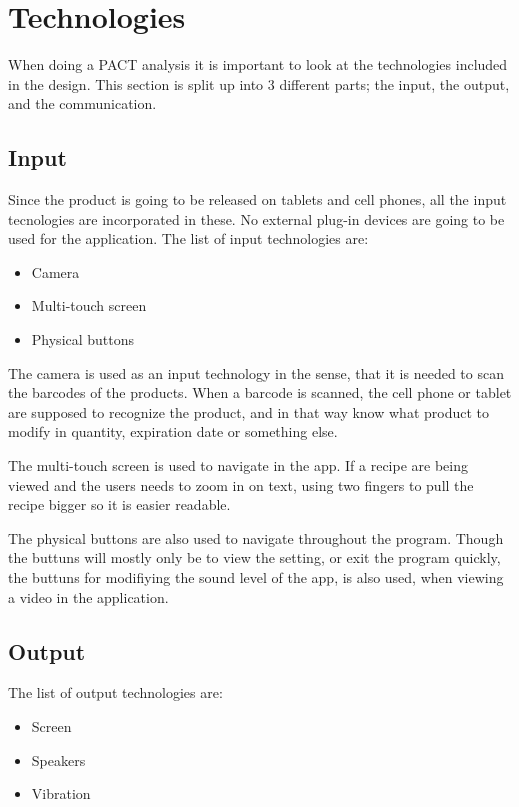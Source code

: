 \section{Technologies}

When doing a PACT analysis it is important to look at the technologies included in the design. This section is split up into 3 different parts; the input, the output, and the communication.

\subsection{Input}

Since the product is going to be released on tablets and cell phones, all the input tecnologies are incorporated in these. No external plug-in devices are going to be used for the application. The list of input technologies are:

\begin{itemize}
    \item Camera
    \item Multi-touch screen
    \item Physical buttons
\end{itemize}

The camera is used as an input technology in the sense, that it is needed to scan the barcodes of the products. When a barcode is scanned, the cell phone or tablet are supposed to recognize the product, and in that way know what product to modify in quantity, expiration date or something else.

The multi-touch screen is used to navigate in the app. If a recipe are being viewed and the users needs to zoom in on text, using two fingers to pull the recipe bigger so it is easier readable.

The physical buttons are also used to navigate throughout the program. Though the buttuns will mostly only be to view the setting, or exit the program quickly, the buttuns for modifiying the sound level of the app, is also used, when viewing a video in the application.

\subsection{Output}

The list of output technologies are:

\begin{itemize}
    \item Screen
    \item Speakers
    \item Vibration
\end{itemize}

